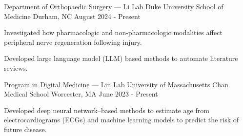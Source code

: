 
\begin{cventries}

  \vspace{-0.5mm}
  \cventry
    {Department of Orthopaedic Surgery — Li Lab} %
    {Duke University School of Medicine} %
    {Durham, NC} %
    {August 2024 - Present} %
    {
      \begin{cvitems} %
        \item {Investigated how pharmacologic and 
        non-pharmacologic modalities affect peripheral nerve regeneration 
        following injury.}
        \item {Developed large language model (LLM) based methods to automate 
        literature reviews.}
      \end{cvitems}
    }

  \vspace{-0.5mm}
  \cventry
    {Program in Digital Medicine — Lin Lab} %
    {University of Massachusetts Chan Medical School} %
    {Worcester, MA} %
    {June 2023 - Present} %
    {
      \begin{cvitems} %
        \item {Developed deep neural network–based methods to estimate age from 
        electrocardiograms (ECGs) and machine learning models to predict the 
        risk of future disease.}
      \end{cvitems}
    }


\end{cventries}
